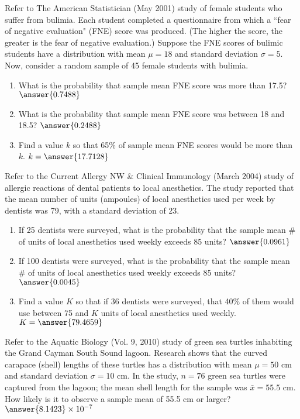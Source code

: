 \documentclass{ximera}
\begin{document}
\begin{problem}
Refer to The American Statistician (May 2001) study of female students who suffer from bulimia.  Each student completed a questionnaire from which a ``fear of negative evaluation" (FNE) score was produced. (The higher the score, the greater is the fear of negative evaluation.) Suppose the FNE scores of bulimic students have a distribution with mean $\mu=18$ and standard deviation $\sigma=5$. Now, consider a random sample of 45 female students with bulimia.
\begin{enumerate}
\item What is the probability that sample mean FNE score was more than 17.5?  $\answer{0.7488}$
\item What is the probability that sample mean FNE score was between 18 and 18.5?  $\answer{0.2488}$
\item Find a value $k$ so that 65\% of sample mean FNE scores would be more than $k$. $k=\answer{17.7128}$
\end{enumerate}

\end{problem}



\begin{problem}
 Refer to the Current Allergy NW \& Clinical Immunology (March 2004) study of allergic reactions of dental patients to local anesthetics. The study reported that the mean number of units (ampoules) of local anesthetics used per week by dentists was 79, with a standard deviation of 23.

\begin{enumerate}
\item If 25 dentists were surveyed, what is the probability that the sample mean \# of units of local anesthetics used weekly exceeds 85 units? $\answer{0.0961}$
\item If 100 dentists were surveyed, what is the probability that the sample mean \# of units of local anesthetics used weekly exceeds 85 units? $\answer{0.0045}$
\item Find a value $K$ so that if 36 dentists were surveyed, that 40\% of them would use between 75 and $K$ units of local anesthetics used weekly.  $K=\answer{79.4659}$
\end{enumerate}


\end{problem}


\begin{problem}
 Refer to the Aquatic Biology (Vol. 9, 2010) study of green sea turtles inhabiting the Grand Cayman South Sound lagoon. Research shows that the curved carapace (shell) lengths of these turtles has a distribution with mean $\mu = 50$ cm and standard deviation $\sigma = 10$ cm. In the study, $n = 76$ green sea turtles were captured from the lagoon; the mean shell length for the sample was $\bar{x} = 55.5$ cm. How likely is it to observe a sample mean of 55.5 cm or larger?  $\answer{8.1423}\times 10^{-7}$
\end{problem}
\end{document}
